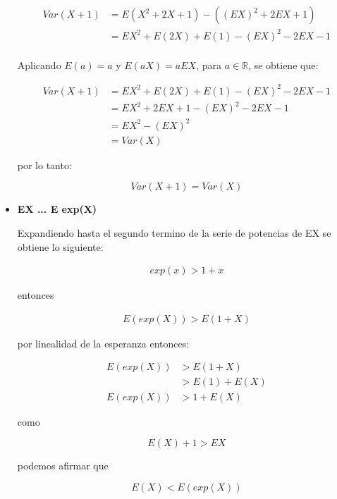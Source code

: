 \begin{itemize}
	      \begin{align*}
		      Var(X+1) & =E(X^2+2X+1)- ((EX)^2+2EX+1)           \\
		               & = EX^2 + E(2X) + E(1) - (EX)^2 -2EX -1 \\
	      \end{align*}


	      Aplicando $E(a)=a$ y $E(aX)=aEX$, para $a\in \mathbb{R}$, se obtiene que:

	      \begin{align*}
		      Var(X+1) & = EX^2 + E(2X) + E(1) - (EX)^2 -2EX -1 \\
		               & = EX^2 +2EX +1 -(EX)^2 -2EX -1         \\
		               & = EX^2 -(EX)^2                         \\
		               & = Var(X)
	      \end{align*}

	      por lo tanto:

	      \begin{equation*}
		      Var(X+1) = Var(X)
	      \end{equation*}
	\item \textbf{EX ... E exp(X)}

	      Expandiendo hasta el segundo termino de la serie de potencias de EX se obtiene lo siguiente:

	      \begin{align*}
		      exp(x) > 1 +x
	      \end{align*}

	      entonces

	      \begin{align*}
		      E(exp(X))  > E(1+X)
	      \end{align*}

	      por linealidad de  la esperanza entonces:

	      \begin{align*}
		      E(exp(X)) & > E(1+X)    \\
		                & >E(1) +E(X) \\
		      E(exp(X)) & > 1 + E(X)
	      \end{align*}

	      como

	      \begin{equation*}
		      E(X)+1 >EX
	      \end{equation*}

	      podemos afirmar que

	      \begin{equation*}
		      E(X) < E(exp(X))
	      \end{equation*}
\end{itemize}
